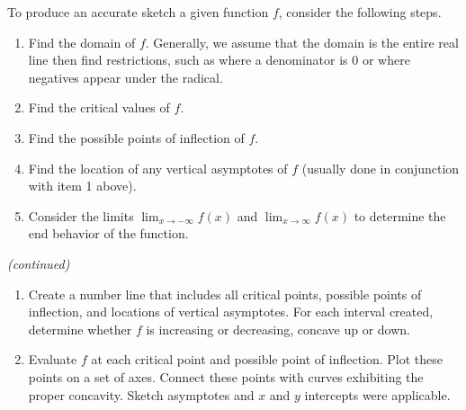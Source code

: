 \enlargethispage{\baselineskip}
{}
{To produce an accurate sketch a given function $f$, consider the following steps.
\begin{enumerate}
\item		Find the domain of $f$. Generally, we assume that the domain is the entire real line then find restrictions, such as where a denominator is 0 or where negatives appear under the radical.
\item		Find the critical values of $f$.
\item		Find the possible points of inflection of $f$.
\item		Find the location of any vertical asymptotes of $f$ (usually done in conjunction with item 1 above).
\item		Consider the limits $\lim_{x\to-\infty}f(x)$ and $\lim_{x\to\infty}f(x)$ to determine the end behavior of the function.
\end{enumerate}
\small\textit{(continued)}\normalsize
}
\addtocounter{keyideacounter}{-1}
{%
\begin{enumerate}\addtocounter{enumi}{5}
\item		Create a number line that includes all critical points, possible points of inflection, and locations of vertical asymptotes. For each interval created, determine whether $f$ is increasing or decreasing, concave up or down.
\item		Evaluate $f$ at each critical point and possible point of inflection. Plot these points on a set of axes. Connect these points with curves exhibiting the proper concavity. Sketch asymptotes and $x$ and $y$ intercepts were applicable.
\end{enumerate}
}
